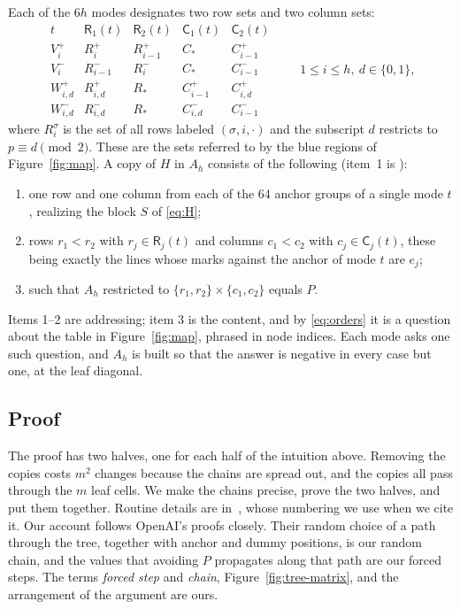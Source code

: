 \documentclass{article}
\theoremstyle{plain}
\theoremstyle{definition}
\begin{document}
Each of the $6h$ modes designates two row sets and two column sets:
\begin{equation}\label{eq:modes}
\begin{array}{ccccc}
 t & \mathsf R_1(t) & \mathsf R_2(t) & \mathsf C_1(t) & \mathsf C_2(t)\\[2pt]
 V_i^+ & R_i^+ & R_{i-1}^+ & C_* & C_{i-1}^+\\
 V_i^- & R_{i-1}^- & R_i^- & C_* & C_{i-1}^-\\
 W_{i,d}^+ & R_{i,d}^+ & R_* & C_{i-1}^+ & C_{i,d}^+\\
 W_{i,d}^- & R_{i,d}^- & R_* & C_{i,d}^- & C_{i-1}^-
\end{array}
\qquad 1\le i\le h,\ d\in\{0,1\},
\end{equation}
where $R_i^\sigma$ is the set of all rows labeled $(\sigma,i,\cdot)$ and the subscript
$d$ restricts to $p\equiv d\pmod2$. These are the sets referred to by the
blue regions of Figure~\ref{fig:map}. A copy of $H$ in $A_h$ consists of the
following (item~1 is \cite[Corollary~4.5]{openai}):
\begin{enumerate}\itemsep1pt
\item one row and one column from each of the $64$ anchor groups of a single
mode $t$, realizing the block $S$ of \eqref{eq:H};
\item rows $r_1<r_2$ with $r_j\in\mathsf R_j(t)$ and columns $c_1<c_2$ with
$c_j\in\mathsf C_j(t)$, these being exactly the lines whose marks against
the anchor of mode $t$ are $e_j$;
\item such that $A_h$ restricted to $\{r_1,r_2\}\times\{c_1,c_2\}$ equals
$P$.
\end{enumerate}
Items 1--2 are addressing; item 3 is the content, and by \eqref{eq:orders}
it is a question about the table in Figure~\ref{fig:map}, phrased in node indices. Each
mode asks one such question, and $A_h$ is built so that the answer is
negative in every case but one, at the leaf diagonal. 

\subsection*{Proof}

The proof has two halves, one for each half of the intuition above. Removing
the copies costs $m^2$ changes because the chains are spread out, and the
copies all pass through the $m$ leaf cells. We make the chains precise, prove
the two halves, and put them together. Routine details are in~\cite{openai},
whose numbering we use when we cite it. Our account follows OpenAI's proofs
\cite[Sections~3 and~4]{openai} closely. Their random choice of a path through
the tree, together with anchor and dummy positions, is our random chain, and
the values that avoiding $P$ propagates along that path are our forced steps.
The terms \emph{forced step} and \emph{chain}, Figure~\ref{fig:tree-matrix},
and the arrangement of the argument are ours.
\end{document}
